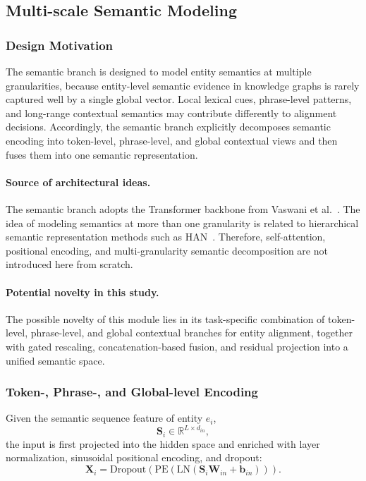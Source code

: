 \subsection{Multi-scale Semantic Modeling}

\subsubsection{Design Motivation}

The semantic branch is designed to model entity semantics at multiple granularities, because entity-level semantic evidence in knowledge graphs is rarely captured well by a single global vector. Local lexical cues, phrase-level patterns, and long-range contextual semantics may contribute differently to alignment decisions. Accordingly, the semantic branch explicitly decomposes semantic encoding into token-level, phrase-level, and global contextual views and then fuses them into one semantic representation.

\paragraph{Source of architectural ideas.}
The semantic branch adopts the Transformer backbone from Vaswani et al.~\cite{vaswani2017attention}. The idea of modeling semantics at more than one granularity is related to hierarchical semantic representation methods such as HAN~\cite{yang2016han}. Therefore, self-attention, positional encoding, and multi-granularity semantic decomposition are not introduced here from scratch.

\paragraph{Potential novelty in this study.}
The possible novelty of this module lies in its task-specific combination of token-level, phrase-level, and global contextual branches for entity alignment, together with gated rescaling, concatenation-based fusion, and residual projection into a unified semantic space.

\subsubsection{Token-, Phrase-, and Global-level Encoding}

Given the semantic sequence feature of entity $e_i$,
\[
\mathbf{S}_i \in \mathbb{R}^{L \times d_{in}},
\]
the input is first projected into the hidden space and enriched with layer normalization, sinusoidal positional encoding, and dropout:
\begin{equation}
\mathbf{X}_i
=
\mathrm{Dropout}
\left(
\mathrm{PE}
\left(
\mathrm{LN}(\mathbf{S}_i\mathbf{W}_{in}+\mathbf{b}_{in})
\right)
\right).
\end{equation}

